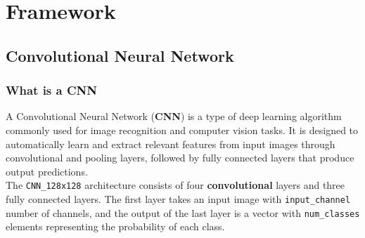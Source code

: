\documentclass{report}
\begin{document}
\chapter{Framework}
\section{Convolutional Neural Network}
\subsection{What is a CNN}
A Convolutional Neural Network (\textbf{CNN}) is a type of deep learning algorithm commonly used for image recognition and computer vision tasks. It is designed to automatically learn and extract relevant features from input images through convolutional and pooling layers, followed by fully connected layers that produce output predictions. \\
The \texttt{CNN\_128x128} architecture consists of four \textbf{convolutional} layers and three fully connected layers. The first layer takes an input image with \texttt{input\_channel} number of channels, and the output of the last layer is a vector with \texttt{num\_classes} elements representing the probability of each class.
\end{document}
